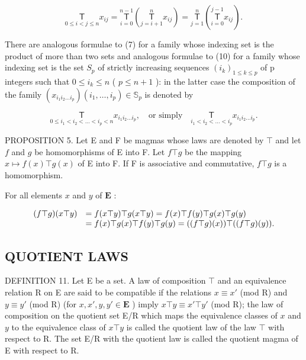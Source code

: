 \[
\underset {0 \leqslant i <   j \leqslant n} {\mathsf {T}} x _ {i j} = \underset {i = 0} {\overset {n - 1} {\mathsf {T}}} \left(\underset {j = i + 1} {\overset {n} {\mathsf {T}}} x _ {i j}\right) = \underset {j = 1} {\overset {n} {\mathsf {T}}} \left(\underset {i = 0} {\overset {j - 1} {\mathsf {T}}} x _ {i j}\right).\tag{10}
\]

There are analogous formulae to (7) for a family whose indexing set is the product of more than two sets and analogous formulae to (10) for a family whose indexing set is the set \(S_{p}\) of strictly increasing sequences \((i_{k})_{1\leqslant k\leqslant p}\) of p integers such that \(0\leqslant i_{k}\leqslant n\) ( \(p\leqslant n+1\) ): in the latter case the composition of the family \((x_{i_{1}i_{2}\ldots i_{p}})(i_{1},\ldots,i_{p})\in\mathbb{S}_{p}\) is denoted by

\[
\underset {0 \leqslant i _ {1} <   i _ {2} <   \dots <   i _ {p} <   n} {\mathsf {T}} x _ {i _ {1} i _ {2} \ldots i _ {p}}, \quad \text {or simply} \quad \underset {i _ {1} <   i _ {2} <   \dots <   i _ {p}} {\mathsf {T}} x _ {i _ {1} i _ {2} \ldots i _ {p}}.
\]

PROPOSITION 5. Let E and F be magmas whose laws are denoted by \(\top\) and let \(f\) and \(g\) be homomorphisms of E into F. Let \(f \top g\) be the mapping \(x \mapsto f(x) \top g(x)\) of E into F. If F is associative and commutative, \(f \top g\) is a homomorphism.

For all elements \(x\) and \(y\) of \(\mathbf{E}\) :

\[
\begin{array}{r l} (f \top g) (x \top y) & = f (x \top y) \top g (x \top y) = f (x) \top f (y) \top g (x) \top g (y) \\ & = f (x) \top g (x) \top f (y) \top g (y) = ((f \top g) (x)) \top ((f \top g) (y)). \end{array}
\]

\subsection{QUOTIENT LAWS}

DEFINITION 11. Let E be a set. A law of composition \(\top\) and an equivalence relation R on E are said to be compatible if the relations \(x \equiv x'\) (mod R) and \(y \equiv y'\) (mod R) (for \(x, x', y, y' \in \mathbf{E}\) ) imply \(x \top y \equiv x' \top y'\) (mod R); the law of composition on the quotient set E/R which maps the equivalence classes of \(x\) and \(y\) to the equivalence class of \(x \top y\) is called the quotient law of the law \(\top\) with respect to R. The set E/R with the quotient law is called the quotient magma of E with respect to R.

